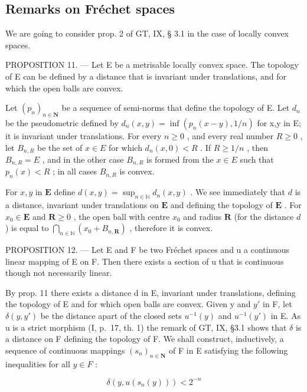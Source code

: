 \subsection{Remarks on Fréchet spaces}

We are going to consider prop. 2 of GT, IX, § 3.1 in the case of locally convex spaces.

PROPOSITION 11. --- Let E be a metrisable locally convex space. The topology of E can be defined by a distance that is invariant under translations, and for which the open balls are convex.

Let \((p_{n})_{n\in\mathbf{N}}\) be a sequence of semi-norms that define the topology of E. Let \(d_{n}\) be the pseudometric defined by \(d_{n}(x,y)=\inf(p_{n}(x-y),1/n)\) for x,y in E; it is invariant under translations. For every \(n\geqslant0\) , and every real number \(R\geqslant0\) , let \(B_{n,R}\) be the set of \(x\in E\) for which \(d_{n}(x,0)<R\) . If \(R\geqslant1/n\) , then \(B_{n,R}=E\) , and in the other case \(B_{n,R}\) is formed from the \(x\in E\) such that \(p_{n}(x)<R\) ; in all cases \(B_{n,R}\) is convex.

For \(x, y\) in \(\mathbf{E}\) define \(d(x, y) = \sup_{n \in \mathbb{N}} d_n(x, y)\) . We see immediately that \(d\) is a distance, invariant under translations on \(\mathbf{E}\) and defining the topology of \(\mathbf{E}\) . For \(x_0 \in \mathbf{E}\) and \(\mathbf{R} \geqslant 0\) , the open ball with centre \(x_0\) and radius \(\mathbf{R}\) (for the distance \(d\) ) is equal to \(\bigcap_{n \in \mathbb{N}} (x_0 + B_{n,\mathbf{R}})\) , therefore it is convex.

PROPOSITION 12. --- Let E and F be two Fréchet spaces and u a continuous linear mapping of E on F. Then there exists a section of u that is continuous though not necessarily linear.

By prop. 11 there exists a distance d in E, invariant under translations, defining the topology of E and for which open balls are convex. Given y and \(y'\) in F, let \(\delta(y, y')\) be the distance apart of the closed sets \(u^{-1}(y)\) and \(u^{-1}(y')\) in E. As u is a strict morphism (I, p.~17, th. 1) the remark of GT, IX, §3.1 shows that \(\delta\) is a distance on F defining the topology of F. We shall construct, inductively, a sequence of continuous mappings \((s_n)_{n \in \mathbf{N}}\) of F in E satisfying the following inequalities for all \(y \in F\) :

\[
\delta (y, u (s _ {n} (y))) <   2 ^ {- n}\tag{2}
\]

